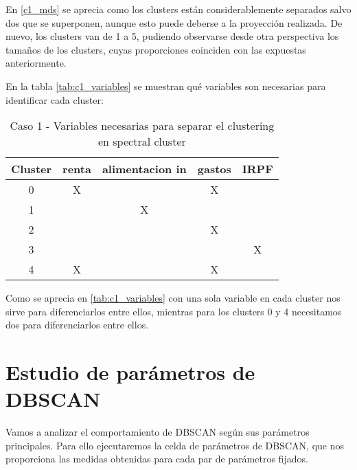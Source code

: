 En \eqref{c1_mds} se aprecia como los clusters están considerablemente separados salvo dos que se superponen, aunque esto puede deberse a la proyección realizada. De nuevo, los clusters van de 1 a 5, pudiendo observarse desde otra perspectiva los tamaños de los clusters, cuyas proporciones coinciden con las expuestas anteriormente.


En la tabla  \eqref{tab:c1_variables} se muestran qué variables son necesarias para identificar cada cluster:

\begin{table}[H]
\centering
\caption{Caso 1 - Variables necesarias para separar el clustering en spectral cluster}
\label{tab:c1_variables}
\begin{tabular}{ccccc}
\toprule
 Cluster & renta & alimentacion in & gastos & IRPF \\
\midrule
0 & X & & X & \\
1 & & X & & \\
2 & & & X & \\
3 & & & & X \\
4 & X & & X & \\
\bottomrule
\end{tabular}
\end{table}
Como se aprecia en \eqref{tab:c1_variables} con una sola variable en cada cluster nos sirve para diferenciarlos entre ellos, mientras para los clusters 0 y 4 necesitamos dos para diferenciarlos entre ellos.

\section{Estudio de parámetros de DBSCAN}

Vamos a analizar el comportamiento de DBSCAN según sus parámetros principales. Para ello ejecutaremos la celda de parámetros de DBSCAN, que nos proporciona las medidas obtenidas para cada par de parámetros fijados.

